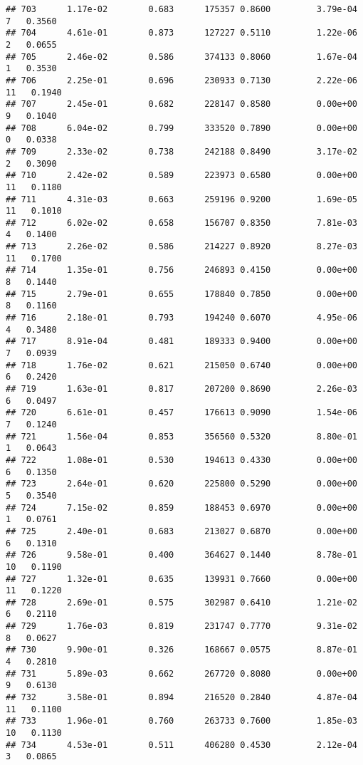 \documentclass[
]{article}
\begin{document}
\begin{verbatim}
## 703      1.17e-02        0.683      175357 0.8600         3.79e-04   7   0.3560
## 704      4.61e-01        0.873      127227 0.5110         1.22e-06   2   0.0655
## 705      2.46e-02        0.586      374133 0.8060         1.67e-04   1   0.3530
## 706      2.25e-01        0.696      230933 0.7130         2.22e-06  11   0.1940
## 707      2.45e-01        0.682      228147 0.8580         0.00e+00   9   0.1040
## 708      6.04e-02        0.799      333520 0.7890         0.00e+00   0   0.0338
## 709      2.33e-02        0.738      242188 0.8490         3.17e-02   2   0.3090
## 710      2.42e-02        0.589      223973 0.6580         0.00e+00  11   0.1180
## 711      4.31e-03        0.663      259196 0.9200         1.69e-05  11   0.1010
## 712      6.02e-02        0.658      156707 0.8350         7.81e-03   4   0.1400
## 713      2.26e-02        0.586      214227 0.8920         8.27e-03  11   0.1700
## 714      1.35e-01        0.756      246893 0.4150         0.00e+00   8   0.1440
## 715      2.79e-01        0.655      178840 0.7850         0.00e+00   8   0.1160
## 716      2.18e-01        0.793      194240 0.6070         4.95e-06   4   0.3480
## 717      8.91e-04        0.481      189333 0.9400         0.00e+00   7   0.0939
## 718      1.76e-02        0.621      215050 0.6740         0.00e+00   6   0.2420
## 719      1.63e-01        0.817      207200 0.8690         2.26e-03   6   0.0497
## 720      6.61e-01        0.457      176613 0.9090         1.54e-06   7   0.1240
## 721      1.56e-04        0.853      356560 0.5320         8.80e-01   1   0.0643
## 722      1.08e-01        0.530      194613 0.4330         0.00e+00   6   0.1350
## 723      2.64e-01        0.620      225800 0.5290         0.00e+00   5   0.3540
## 724      7.15e-02        0.859      188453 0.6970         0.00e+00   1   0.0761
## 725      2.40e-01        0.683      213027 0.6870         0.00e+00   6   0.1310
## 726      9.58e-01        0.400      364627 0.1440         8.78e-01  10   0.1190
## 727      1.32e-01        0.635      139931 0.7660         0.00e+00  11   0.1220
## 728      2.69e-01        0.575      302987 0.6410         1.21e-02   6   0.2110
## 729      1.76e-03        0.819      231747 0.7770         9.31e-02   8   0.0627
## 730      9.90e-01        0.326      168667 0.0575         8.87e-01   4   0.2810
## 731      5.89e-03        0.662      267720 0.8080         0.00e+00   9   0.6130
## 732      3.58e-01        0.894      216520 0.2840         4.87e-04  11   0.1100
## 733      1.96e-01        0.760      263733 0.7600         1.85e-03  10   0.1130
## 734      4.53e-01        0.511      406280 0.4530         2.12e-04   3   0.0865

\end{verbatim}
\end{document}
